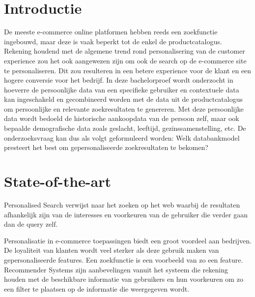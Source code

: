 
\section{Introductie} %
\label{sec:introductie}

De meeste e-commerce online platformen hebben reeds een zoekfunctie ingebouwd, maar deze is vaak beperkt tot de  enkel de productcatalogus. Rekening houdend met de algemene trend rond personalisering van de customer experience zou het ook aangewezen zijn om ook de search op de e-commerce site te personaliseren. Dit zou resulteren in een betere experience voor de klant en een hogere conversie voor het bedrijf. In deze bachelorproef wordt onderzocht in hoeverre de persoonlijke data van een specifieke gebruiker en contextuele data kan ingeschakeld en gecombineerd worden met de data uit de productcatalogus om persoonlijke en relevante zoekresultaten te genereren. 
Met deze persoonlijke data wordt bedoeld de historische aankoopdata van de persoon zelf, maar ook bepaalde demografische data zoals geslacht, leeftijd, gezinssamenstelling, etc. De onderzoeksvraag kan dus als volgt geformuleerd worden: Welk databankmodel presteert het best om gepersonaliseerde zoekresultaten te bekomen?



\section{State-of-the-art}
\label{sec:state-of-the-art}

Personalised Search \autocite{Pitkow2002} verwijst naar het zoeken op het web waarbij de resultaten afhankelijk zijn van de interesses en voorkeuren van de gebruiker die verder gaan dan de query zelf. 

Personalisatie in e-commerce toepassingen biedt een groot voordeel aan bedrijven. De loyaliteit van klanten wordt veel sterker als deze gebruik maken van gepersonaliseerde features.\autocite{Telang2005} Een zoekfunctie is een voorbeeld van zo een feature.
Recommender Systems \autocite{Resnick1997} zijn aanbevelingen vanuit het systeem die rekening houden met de beschikbare informatie van gebruikers en hun voorkeuren om zo een filter te plaatsen op de informatie die weergegeven wordt. 

